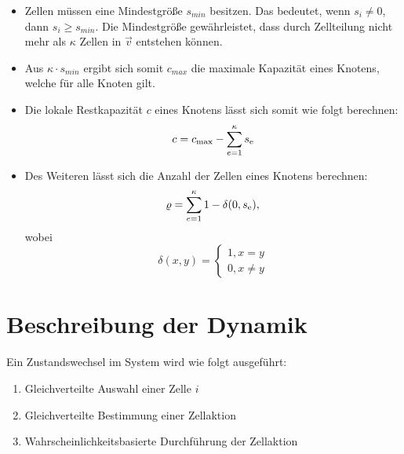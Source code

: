 \documentclass[11pt,a4paper,pointlessnumbers]{scrreprt}  %
\begin{document}
\begin{itemize}
	\item Zellen müssen eine Mindestgröße $s_{min}$ besitzen. Das bedeutet, wenn $s_{i} \neq 0$, dann $s_{i} \geq s_{min}$. Die Mindestgröße gewährleistet, dass durch Zellteilung nicht mehr als $\kappa$ Zellen in $\vec{v}$ entstehen können.
	
	\item Aus $\kappa \cdot s_{min}$ ergibt sich somit $c_{max}$ die maximale Kapazität eines Knotens, welche für alle Knoten gilt. 
	
	\item Die lokale Restkapazität $c$ eines Knotens lässt sich somit wie folgt berechnen: 
	\[ 
	c = c\textsubscript{max} - \sum_{e=1}^{\kappa} s\textsubscript{e}
	\] 
	
	\item Des Weiteren lässt sich die Anzahl der Zellen eines Knotens berechnen: 
	\[
	\varrho = \sum_{e=1}^{\kappa} 1 - \delta(0, s\textsubscript{e}),
	\]
	wobei 
	\[
	\delta(x,y) = 
	\begin{cases}
	1, x = y \\
	0, x \neq y
	\end{cases}
	\]
	
\end{itemize}

\section{Beschreibung der Dynamik}
Ein Zustandswechsel im System wird wie folgt ausgeführt: \par
\begin{enumerate}
	\item Gleichverteilte Auswahl einer Zelle $i$
	\item Gleichverteilte Bestimmung einer Zellaktion
	\item Wahrscheinlichkeitsbasierte Durchführung der Zellaktion 
\end{enumerate}
\end{document}
